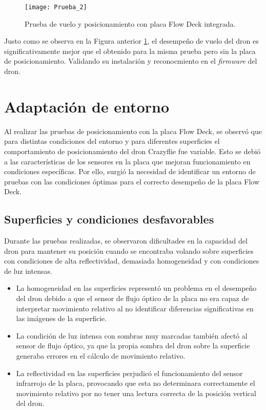 \begin{figure}[htbp]
	\centering
	\texttt{[image: Prueba\_2]}
	\caption{Prueba de vuelo y posicionamiento con placa Flow Deck integrada.}
	\label{fig:Prueba_2}
\end{figure} 

Justo como se observa en la Figura anterior \ref{fig:Prueba_2}, el desempeño de vuelo del dron es significativamente mejor que el obtenido para la misma prueba pero sin la placa de posicionamiento. Validando su instalación y reconocmiento en el \textit{firmware} del dron.
 
 
\section{Adaptación de entorno}
Al realizar las pruebas de posicionamiento con la placa Flow Deck, se observó que para distintas condiciones del entorno y para diferentes superficies el comportamiento de posicionamiento del dron Crazyflie fue variable. Esto se debió a las características de los sensores en la placa que mejoran funcionamiento en condiciones específicas. Por ello, surgió la necesidad de identificar un entorno de pruebas con las condiciones óptimas para el correcto desempeño de la placa Flow Deck. 

\subsection{Superficies y condiciones desfavorables}
Durante las pruebas realizadas, se observaron dificultades en la capacidad del dron para mantener su posición cuando se encontraba volando sobre superficies con condiciones de alta reflectividad, demasiada homogeneidad y con condiciones de luz intensas. 
\begin{itemize} 
	\item La homogeneidad en las superficies representó un problema en el desempeño del dron debido a que el sensor de flujo óptico de la placa no era capaz de interpretar movimiento relativo al no identificar diferencias significativas en las imágenes de la superficie.
	\item La condición de luz intensa con sombras muy marcadas también afectó al sensor de flujo óptico, ya que la propia sombra del dron sobre la superficie generaba errores en el cálculo de movimiento relativo.
	\item La reflectividad en las superficies perjudicó el funcionamiento del sensor infrarrojo de la placa, provocando que esta no determinara correctamente el movimiento relativo por no tener una lectura correcta de la posición vertical del dron.
\end{itemize}

